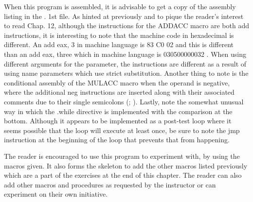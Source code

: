 \documentclass[10pt]{book}
\begin{document}
\begin{center}
\begin{center}
When this program is assembled, it is advisable to get a copy of the assembly listing in the . 1st file. As hinted at previously and to pique the reader's interest to read Chap. 12, although the instructions for the ADDACC macro are both add instructions, it is interesting to note that the machine code in hexadecimal is different. An add eax, 3 in machine language is 83 C0 02 and this is different than an add eax, three which in machine language is 030500000032 . When using different arguments for the parameter, the instructions are different as a result of using name parameters which use strict substitution. Another thing to note is the conditional assembly of the MULACC macro when the operand is negative, where the additional neg instructions are inserted along with their associated comments due to their single semicolons (; ). Lastly, note the somewhat unusual way in which the .while directive is implemented with the comparison at the bottom. Although it appears to be implemented as a post-test loop where it seems possible that the loop will execute at least once, be sure to note the jmp instruction at the beginning of the loop that prevents that from happening.

The reader is encouraged to use this program to experiment with, by using the macros given. It also forms the skeleton to add the other macros listed previously which are a part of the exercises at the end of this chapter. The reader can also add other macros and procedures as requested by the instructor or can experiment on their own initiative.


\end{center}
\end{center}
\end{document}
